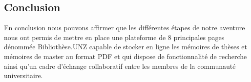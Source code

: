 \subsection*{Conclusion}
En conclusion nous pouvons affirmer que les différentes étapes de notre aventure nous ont permis de mettre en place une plateforme de 8 principales pages dénommée Bibliothèse.UNZ capable de stocker en ligne les mémoires de thèses et mémoires de master au format PDF et qui dispose de fonctionnalité de recherche ainsi qu'un cadre d'échange collaboratif entre les membres de la communauté universitaire.